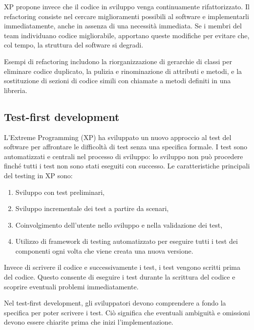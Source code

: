 XP propone invece che il codice in sviluppo venga continuamente rifattorizzato. Il refactoring consiste nel cercare miglioramenti possibili al software e implementarli immediatamente, anche in assenza di una necessità immediata. Se i membri del team individuano codice migliorabile, apportano queste modifiche per evitare che, col tempo, la struttura del software si degradi.

Esempi di refactoring includono la riorganizzazione di gerarchie di classi per eliminare codice duplicato, la pulizia e rinominazione di attributi e metodi, e la sostituzione di sezioni di codice simili con chiamate a metodi definiti in una libreria.

\subsection{Test-first development}
L’Extreme Programming (XP) ha sviluppato un nuovo approccio al test del software per affrontare le difficoltà di test senza una specifica formale. I test sono automatizzati e centrali nel processo di sviluppo: lo sviluppo non può procedere finché tutti i test non sono stati eseguiti con successo. Le caratteristiche principali del testing in XP sono:
\begin{enumerate}
    \item Sviluppo con test preliminari,
    \item Sviluppo incrementale dei test a partire da scenari,
    \item Coinvolgimento dell'utente nello sviluppo e nella validazione dei test,
    \item Utilizzo di framework di testing automatizzato per eseguire tutti i test dei componenti ogni volta che viene creata una nuova versione.
\end{enumerate}
Invece di scrivere il codice e successivamente i test, i test vengono scritti prima del codice. Questo consente di eseguire i test durante la scrittura del codice e scoprire eventuali problemi immediatamente.

Nel test-first development, gli sviluppatori devono comprendere a fondo la specifica per poter scrivere i test. Ciò significa che eventuali ambiguità e omissioni devono essere chiarite prima che inizi l’implementazione.

